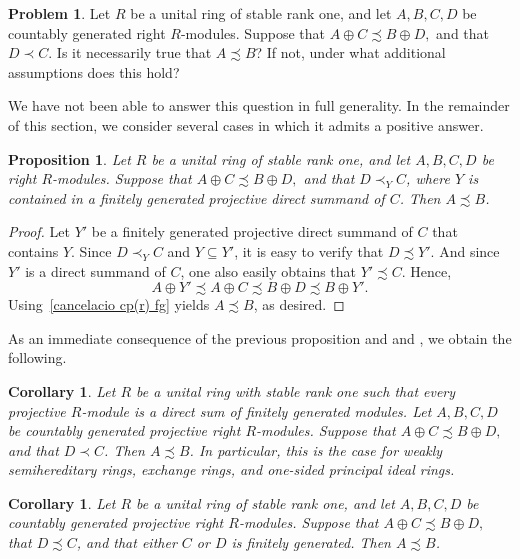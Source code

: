 \documentclass[11pt]{amsart}
\numberwithin{equation}{section}
\newtheorem{cor}[corCt]{Corollary}
\newtheorem{prp}[prpCt]{Proposition}
\theoremstyle{definition}
\newtheorem{prbl}[prblCt]{Problem}
\theoremstyle{plain}
\theoremstyle{definition}
\begin{document}
\begin{prbl}
\label{prbl:main-cancellation-problem}
Let $R$ be a unital ring of stable rank one, and let $A,B,C,D$ be countably generated right $R$-modules. Suppose that $A\oplus C \precsim B\oplus D,$ and that $D\prec C.$ Is it necessarily true that $A \precsim B$? If not, under what additional assumptions does this hold?
\end{prbl}


We have not been able to answer this question in full generality. In the remainder of this section, we consider several cases in which it admits a positive answer.

\begin{prp} \label{Y direct summand}
Let $R$ be a unital ring of stable rank one, and let $A,B,C,D$ be right $R$-modules. Suppose that $A\oplus C \precsim B\oplus D,$ and that $D\prec_Y C$, where $Y$ is contained in a finitely generated projective direct summand of $C$. Then $A \precsim B$.   
\end{prp} 

\begin{proof}
Let $Y'$ be a finitely generated projective direct summand of $C$ that contains $Y$. Since $D\prec_Y C$ and $Y \subseteq Y'$, it is easy to verify that $D \precsim Y'$. And since $Y'$ is a direct summand of $C$, one also easily obtains that $Y' \precsim C$. Hence, 
\begin{equation*}
    A \oplus Y' \precsim A \oplus C \precsim B \oplus D \precsim B \oplus Y'.
\end{equation*}
Using~\autoref{cancelacio cp(r) fg} yields $A \precsim B$, as desired. 
\end{proof}

As an immediate consequence of the previous proposition and \cite{PunMcGRoth07} and \cite{Warfield1972}, we obtain the following.

\begin{cor}
Let $R$ be a unital ring with stable rank one such that every projective $R$-module is a direct sum of finitely generated modules. Let $A,B,C,D$ be countably generated projective right $R$-modules. Suppose that $A\oplus C \precsim B\oplus D,$ and that $D\prec C$. Then $A \precsim B$. In particular, this is the case for weakly semihereditary rings, exchange rings, and one-sided principal ideal rings. 
\end{cor}

\begin{cor}
Let $R$ be a unital ring of stable rank one, and let $A,B,C,D$ be countably generated projective right $R$-modules. Suppose that $A\oplus C \precsim B\oplus D,$ that $D\precsim C$, and that either $C$ or $D$ is finitely generated. Then $A \precsim B$.
\end{cor}
\end{document}
